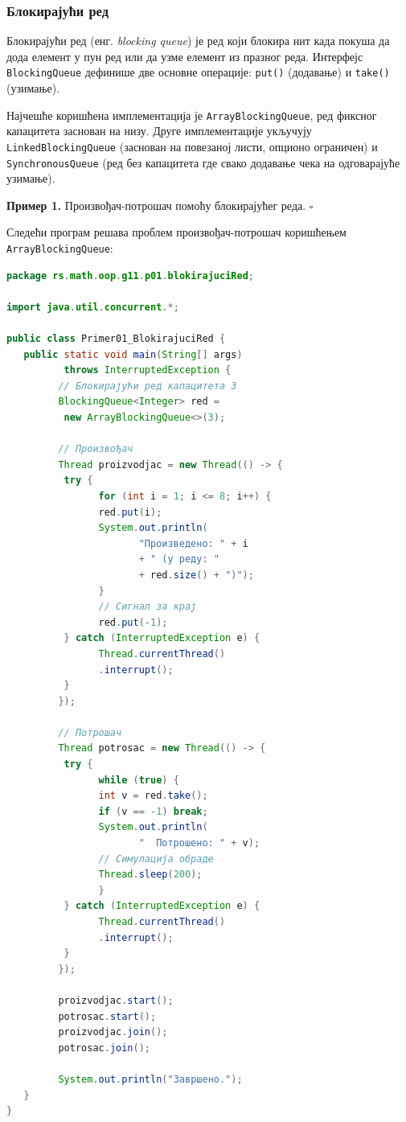 \subsubsection{Блокирајући ред}

Блокирајући ред (енг. \textit{blocking queue}) је ред који блокира нит када покуша да дода елемент у пун ред или да узме елемент из празног реда. Интерфејс \texttt{BlockingQueue} дефинише две основне операције: \texttt{put()} (додавање) и \texttt{take()} (узимање).

Најчешће коришћена имплементација је \texttt{ArrayBlockingQueue}, ред фиксног капацитета заснован на низу. Друге имплементације укључују \texttt{LinkedBlockingQueue} (заснован на повезаној листи, опционо ограничен) и \texttt{SynchronousQueue} (ред без капацитета где свако додавање чека на одговарајуће узимање).


\bigskip

\noindent \textbf{Пример 1.} Произвођач-потрошач помоћу блокирајућег реда. $\square$

\medskip

Следећи програм решава проблем произвођач-потрошач коришћењем \texttt{ArrayBlockingQueue}:


\begin{lstlisting}[language=Java]
package rs.math.oop.g11.p01.blokirajuciRed;
 
import java.util.concurrent.*;
 
public class Primer01_BlokirajuciRed {
   public static void main(String[] args)
          throws InterruptedException {
         // Блокирајући ред капацитета 3
         BlockingQueue<Integer> red =
          new ArrayBlockingQueue<>(3);
 
         // Произвођач
         Thread proizvodjac = new Thread(() -> {
          try {
                for (int i = 1; i <= 8; i++) {
                red.put(i);
                System.out.println(
                       "Произведено: " + i
                       + " (у реду: "
                       + red.size() + ")");
                }
                // Сигнал за крај
                red.put(-1);
          } catch (InterruptedException e) {
                Thread.currentThread()
                .interrupt();
          }
         });
 
         // Потрошач
         Thread potrosac = new Thread(() -> {
          try {
                while (true) {
                int v = red.take();
                if (v == -1) break;
                System.out.println(
                       "  Потрошено: " + v);
                // Симулација обраде
                Thread.sleep(200);
                }
          } catch (InterruptedException e) {
                Thread.currentThread()
                .interrupt();
          }
         });
 
         proizvodjac.start();
         potrosac.start();
         proizvodjac.join();
         potrosac.join();
 
         System.out.println("Завршено.");
   }
}
\end{lstlisting}


